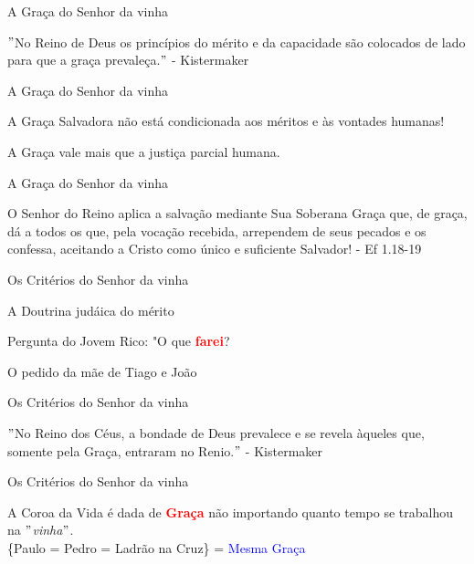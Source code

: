 \documentclass[compress]{beamer}
\begin{document}
\begin{frame}{A Graça do Senhor da vinha}

{\Huge $"$No Reino de Deus os princípios do mérito e da capacidade são colocados de lado para que a graça prevaleça.$"$ - Kistermaker}
\end{frame}

\begin{frame}{A Graça do Senhor da vinha}
\begin{itemize}

{\huge \item[•] A Graça Salvadora não está condicionada aos méritos e às vontades humanas!
\pause
\item[•] A Graça vale mais que a justiça parcial humana.}
\end{itemize}
\end{frame}

\begin{frame}{A Graça do Senhor da vinha}

{\huge O Senhor do Reino aplica a salvação mediante Sua Soberana Graça que, de graça, dá a todos os que, pela vocação recebida, arrependem de seus pecados e os confessa, aceitando a Cristo como único e suficiente Salvador! - Ef 1.18-19}
\end{frame}

\begin{frame}{Os Critérios do Senhor da vinha}
\begin{itemize}

{\Huge \item[•] A Doutrina judáica do mérito
\pause
\item[•] Pergunta do Jovem Rico: "O que \textbf{\textcolor{red}{farei}}?
\pause
\item[•] O pedido da mãe de Tiago e João}
\end{itemize}
\end{frame}

\begin{frame}{Os Critérios do Senhor da vinha}

{\Huge $"$No Reino dos Céus, a bondade de Deus prevalece e se revela àqueles que, somente pela Graça, entraram no Renio.$"$ - Kistermaker}
\end{frame}

\begin{frame}{Os Critérios do Senhor da vinha}
\begin{itemize}

{\huge \item[•] A Coroa da Vida é dada de \textbf{\textcolor{red}{Graça}} não importando quanto tempo se trabalhou na $"$\textit{vinha}$"$.
\pause
\\
\{Paulo = Pedro = Ladrão na Cruz\} = \textcolor{blue}{Mesma Graça}}

\end{itemize}
\end{frame}
\end{document}
